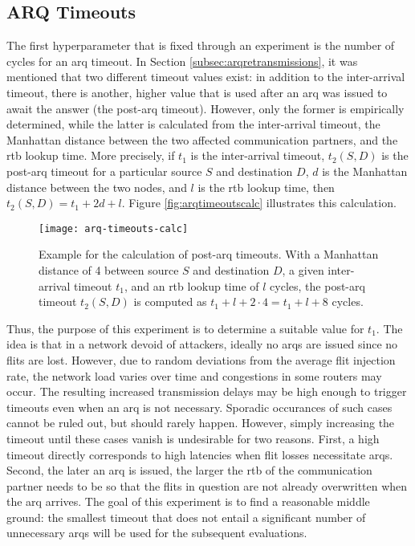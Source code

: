 \subsection{ARQ Timeouts}\label{subsec:arqtimeouts}
The first hyperparameter that is fixed through an experiment is the number of cycles for an \gls{arq} timeout. In Section
\ref{subsec:arqretransmissions}, it was mentioned that two different timeout values exist: in addition to the inter-arrival timeout, there is another,
higher value that is used after an \gls{arq} was issued to await the answer (the post-\gls{arq} timeout). However, only the former
is empirically determined, while the latter is calculated from the inter-arrival timeout, the Manhattan distance between the
two affected communication partners, and the \gls{rtb} lookup time. More precisely, if $t_1$ is the inter-arrival timeout, $t_2(S, D)$ is the post-\gls{arq} timeout for a
particular source $S$ and destination $D$, $d$ is the Manhattan distance between the two nodes, and $l$ is the \gls{rtb} lookup time, then $t_2(S, D)
= t_1 + 2d + l$. Figure \vref{fig:arqtimeoutscalc} illustrates this calculation. 

\begin{figure}
    \centering
    \texttt{[image: arq-timeouts-calc]}
    \caption[Example of the post-ARQ timeout calculation]{Example for the calculation of post-\gls{arq} timeouts. With a Manhattan distance of 4
    between source $S$ and destination $D$, a given inter-arrival timeout $t_1$, and an \gls{rtb} lookup time of $l$ cycles, the post-\gls{arq}
    timeout $t_2(S, D)$ is computed as $t_1 + l + 2 \cdot 4 = t_1 + l + 8$ cycles.}
    \label{fig:arqtimeoutscalc}
\end{figure}

Thus, the purpose of this experiment is to determine a suitable value for $t_1$. The idea is that in a network devoid of attackers, ideally no
\glspl{arq} are issued since no flits are lost. However, due to random deviations from the average flit injection rate, the network load varies over
time and congestions in some routers
may occur. The resulting increased transmission delays may be high enough to trigger timeouts even when an \gls{arq} is not necessary. Sporadic
occurances of such cases cannot be ruled out, but should rarely happen. However, simply increasing the timeout until these cases vanish is undesirable
for two reasons. First, a high timeout directly corresponds to high latencies when flit losses necessitate \glspl{arq}. Second, the later an \gls{arq}
is issued, the larger the \gls{rtb} of the communication partner needs to be so that the flits in question are not already overwritten when the
\gls{arq} arrives. The goal of this experiment is to find a reasonable middle ground: the smallest timeout that does not entail a significant number of
unnecessary \glspl{arq} will be used for the subsequent evaluations.

